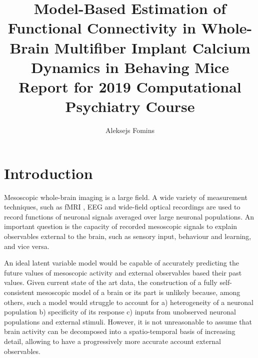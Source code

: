 \documentclass[a4paper,10pt]{article}
\title{
  Model-Based Estimation of Functional Connectivity in Whole-Brain Multifiber Implant Calcium Dynamics in Behaving Mice\\
  \vspace{10pt}
  \small Report for 2019 Computational Psychiatry Course}
\author{Aleksejs Fomins}
\begin{document}
\maketitle

\section{Introduction}
Mesoscopic whole-brain imaging is a large field. A wide variety of measurement techniques, such as fMRI \cite{ogawa_brain_1990, belliveau_functional_1990, deyoe_functional_1994, buxton_modeling_2004, kiebel_dynamic_2008}, EEG \cite{wright_dynamics_1996, baillet_bayesian_1997, gross_dynamic_2001, kececi_quantitative_2008} and wide-field optical recordings \cite{gilad_behavioral_2018, silasi_intact_2016, holtmaat_long-term_2009, dombeck_imaging_2007} are used to record functions of neuronal signals averaged over large neuronal populations. An important question is the capacity of recorded mesoscopic signals to explain observables external to the brain, such as sensory input, behaviour and learning, and vice versa.

An ideal latent variable model would be capable of accurately predicting the future values of mesoscopic activity and external observables based their past values. Given current state of the art data, the construction of a fully self-consistent mesoscopic model of a brain or its part is unlikely because, among others, such a model would struggle to account for a) heterogeneity of a neuronal population b) specificity of its response c) inputs from unobserved neuronal populations and external stimuli. However, it is not unreasonable to assume that brain activity can be decomposed into a spatio-temporal basis of increasing detail, allowing to have a progressively more accurate account external observables.
\end{document}
